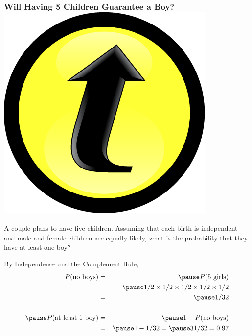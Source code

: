 \documentclass[handout]{beamer}
\begin{document}
\begin{frame}
\frametitle{Will Having 5 Children Guarantee a Boy? \hfill \includegraphics[scale = 0.05]{./images/clicker}}
A couple plans to have five children. Assuming that each birth is independent and male and female children are equally likely, what is the probability that they have at least one boy?
\vspace{1em}

\pause
\alert{By Independence and the Complement Rule,}
	\begin{eqnarray*}
		P(\mbox{no boys})&=&\pause P(\mbox{5 girls})\\
							&=&\pause 1/2 \times 1/2 \times 1/2 \times 1/2 \times 1/2\\
							&=&\pause 1/32\\ \\ \pause
		P(\mbox{at least 1 boy})&=&\pause1 - P(\mbox{no boys})\\
		&=&\pause1 - 1/32 =\pause 31/32 = 0.97
	\end{eqnarray*}

\end{frame}
\end{document}
